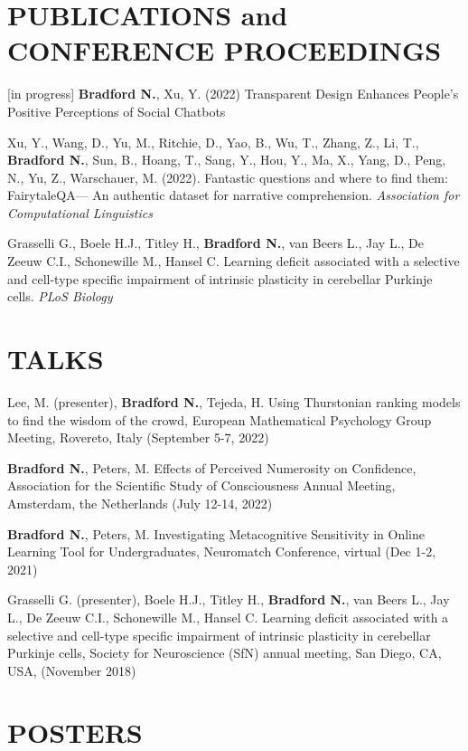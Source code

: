 \documentclass[margin, 10pt]{res} %
\begin{document}
\begin{resume}
\section{PUBLICATIONS and CONFERENCE PROCEEDINGS}

[in progress] \textbf{Bradford N.}, Xu, Y. (2022) Transparent Design Enhances People’s Positive Perceptions of Social Chatbots

Xu, Y., Wang, D., Yu, M., Ritchie, D., Yao, B., Wu, T., Zhang, Z., Li, T., \textbf{Bradford N.}, Sun, B., Hoang, T., Sang, Y., Hou, Y., Ma, X., Yang, D., Peng, N., Yu, Z., Warschauer, M. (2022). Fantastic questions and where to find them: FairytaleQA— An authentic dataset for narrative comprehension. {\sl Association for Computational Linguistics}

Grasselli G., Boele H.J., Titley H., \textbf{Bradford N.}, van Beers L., Jay L., De Zeeuw C.I., Schonewille M., Hansel C. Learning deficit associated with a selective and cell-type specific impairment of intrinsic plasticity in cerebellar Purkinje cells.  {\sl PLoS Biology}

\section{TALKS}
Lee, M. (presenter), \textbf{Bradford N.}, Tejeda, H. Using Thurstonian ranking models to find the wisdom of the crowd, European Mathematical Psychology Group Meeting, Rovereto, Italy (September 5-7, 2022)

\textbf{Bradford N.}, Peters, M. Effects of Perceived Numerosity on Confidence, Association for the Scientific Study of Consciousness Annual Meeting, Amsterdam, the Netherlands (July 12-14, 2022)

\textbf{Bradford N.}, Peters, M. Investigating Metacognitive Sensitivity in Online Learning Tool for Undergraduates, Neuromatch Conference, virtual (Dec 1-2, 2021)

Grasselli G. (presenter), Boele H.J., Titley H., \textbf{Bradford N.}, van Beers L., Jay L., De Zeeuw C.I., Schonewille M., Hansel C. Learning deficit associated with a selective and cell-type specific impairment of intrinsic plasticity in cerebellar Purkinje cells, Society for Neuroscience (SfN) annual meeting, San Diego, CA, USA, (November 2018)

\section{POSTERS}


\end{resume}
\end{document}
